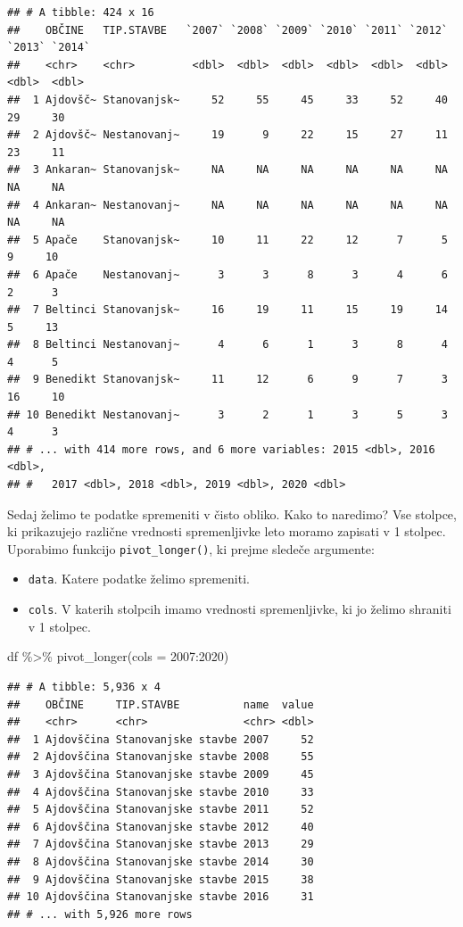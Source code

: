 \documentclass[
]{book}
\newenvironment{Shaded}{\begin{snugshade}}{\end{snugshade}}
\newcommand{\AttributeTok}[1]{\textcolor[rgb]{0.77,0.63,0.00}{#1}}
\newcommand{\FunctionTok}[1]{\textcolor[rgb]{0.00,0.00,0.00}{#1}}
\newcommand{\NormalTok}[1]{#1}
\newcommand{\SpecialCharTok}[1]{\textcolor[rgb]{0.00,0.00,0.00}{#1}}
\newcommand{\StringTok}[1]{\textcolor[rgb]{0.31,0.60,0.02}{#1}}
\providecommand{\tightlist}{%
  \setlength{\itemsep}{0pt}\setlength{\parskip}{0pt}}
\begin{document}
\begin{verbatim}
## # A tibble: 424 x 16
##    OBČINE   TIP.STAVBE   `2007` `2008` `2009` `2010` `2011` `2012` `2013` `2014`
##    <chr>    <chr>         <dbl>  <dbl>  <dbl>  <dbl>  <dbl>  <dbl>  <dbl>  <dbl>
##  1 Ajdovšč~ Stanovanjsk~     52     55     45     33     52     40     29     30
##  2 Ajdovšč~ Nestanovanj~     19      9     22     15     27     11     23     11
##  3 Ankaran~ Stanovanjsk~     NA     NA     NA     NA     NA     NA     NA     NA
##  4 Ankaran~ Nestanovanj~     NA     NA     NA     NA     NA     NA     NA     NA
##  5 Apače    Stanovanjsk~     10     11     22     12      7      5      9     10
##  6 Apače    Nestanovanj~      3      3      8      3      4      6      2      3
##  7 Beltinci Stanovanjsk~     16     19     11     15     19     14      5     13
##  8 Beltinci Nestanovanj~      4      6      1      3      8      4      4      5
##  9 Benedikt Stanovanjsk~     11     12      6      9      7      3     16     10
## 10 Benedikt Nestanovanj~      3      2      1      3      5      3      4      3
## # ... with 414 more rows, and 6 more variables: 2015 <dbl>, 2016 <dbl>,
## #   2017 <dbl>, 2018 <dbl>, 2019 <dbl>, 2020 <dbl>
\end{verbatim}

Sedaj želimo te podatke spremeniti v čisto obliko. Kako to naredimo? Vse stolpce, ki prikazujejo različne vrednosti spremenljivke leto moramo zapisati v 1 stolpec. Uporabimo funkcijo \texttt{pivot\_longer()}, ki prejme sledeče argumente:

\begin{itemize}
\tightlist
\item
  \texttt{data}. Katere podatke želimo spremeniti.
\item
  \texttt{cols}. V katerih stolpcih imamo vrednosti spremenljivke, ki jo želimo shraniti v 1 stolpec.
\end{itemize}

\begin{Shaded}
\begin{Highlighting}[]
\NormalTok{df }\SpecialCharTok{\%\textgreater{}\%} \FunctionTok{pivot\_longer}\NormalTok{(}\AttributeTok{cols =} \StringTok{\textasciigrave{}}\AttributeTok{2007}\StringTok{\textasciigrave{}}\SpecialCharTok{:}\StringTok{\textasciigrave{}}\AttributeTok{2020}\StringTok{\textasciigrave{}}\NormalTok{)}
\end{Highlighting}
\end{Shaded}

\begin{verbatim}
## # A tibble: 5,936 x 4
##    OBČINE     TIP.STAVBE          name  value
##    <chr>      <chr>               <chr> <dbl>
##  1 Ajdovščina Stanovanjske stavbe 2007     52
##  2 Ajdovščina Stanovanjske stavbe 2008     55
##  3 Ajdovščina Stanovanjske stavbe 2009     45
##  4 Ajdovščina Stanovanjske stavbe 2010     33
##  5 Ajdovščina Stanovanjske stavbe 2011     52
##  6 Ajdovščina Stanovanjske stavbe 2012     40
##  7 Ajdovščina Stanovanjske stavbe 2013     29
##  8 Ajdovščina Stanovanjske stavbe 2014     30
##  9 Ajdovščina Stanovanjske stavbe 2015     38
## 10 Ajdovščina Stanovanjske stavbe 2016     31
## # ... with 5,926 more rows
\end{verbatim}
\end{document}
